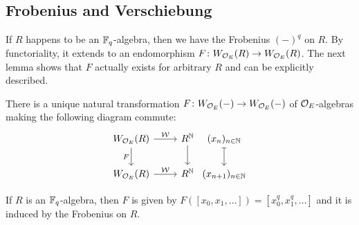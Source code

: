 \documentclass[a4paper, 10pt, oneside, DIV=9, chapterprefix=true, numbers=enddot,bibliography=totoc]{scrbook}
\begin{document}
\subsection{Frobenius and Verschiebung}
If $R$ happens to be an $\mathbb{F}_q$-algebra, then we have the Frobenius $(-)^q$ on $R$. By functoriality, it extends to an endomorphism $F\colon W_{\Oo_E}(R)\morphism W_{\Oo_E}(R)$. The next lemma shows that $F$ actually exists for arbitrary $R$ and can be explicitly described.
\begin{lem}\label{lem:WittFrob}
	\begin{numerate}
		\item There is a unique natural transformation $F\colon W_{\Oo_E}(-)\morphism W_{\Oo_E}(-)$ of $\mathcal{O}_E$-algebras making the following diagram commute:
		\begin{equation*}
			\begin{tikzcd}
				W_{\Oo_E}(R)\rar["\Ww"]\dar["F"{swap}] & R^\IN\dar &[-2.4em] (x_n)_{n\in\IN}\dar[|->]\\
				W_{\Oo_E}(R)\rar["\Ww"] & R^\IN &[-2.4em] (x_{n+1})_{n\in \IN}
			\end{tikzcd}
		\end{equation*}
		\item If $R$ is an $\mathbb{F}_q$-algebra, then $F$ is given by $F([x_0,x_1,\dotsc])=[x_0^q,x_1^q,\dotsc]$ and it is induced by the Frobenius on $R$.
	\end{numerate}
\end{lem}
\end{document}
